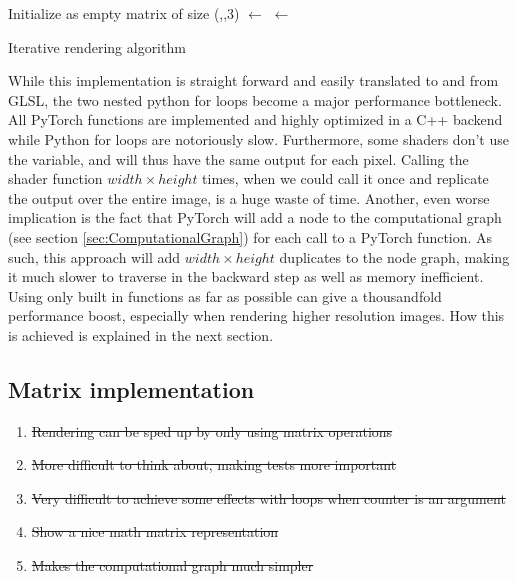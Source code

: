 \begin{algorithm}[H]


\BlankLine
Initialize \Img as empty matrix of size (\Width,\Height,3)\;
\Xs $\leftarrow$ \GetXs{\Width}\;
\Ys $\leftarrow$ \GetYs{\Height}\;
\Return \Img\;
\caption{Iterative rendering algorithm}
\label{alg:IterativeRendering}
\end{algorithm}

While this implementation is straight forward and easily translated to and from GLSL, the two nested python for loops become a major performance bottleneck. All PyTorch functions are implemented and highly optimized in a C++ backend while Python for loops are notoriously slow. Furthermore, some shaders don't use the  variable, and will thus have the same output for each pixel. Calling the shader function $width \times height$ times, when we could call it once and replicate the output over the entire image, is a huge waste of time. Another, even worse implication is the fact that PyTorch will add a node to the computational graph (see section \ref{sec:ComputationalGraph}) for each call to a PyTorch function. As such, this approach will add $width \times height$ duplicates to the node graph, making it much slower to traverse in the backward step as well as memory inefficient. Using only built in functions as far as possible can give a thousandfold performance boost, especially when rendering higher resolution images. How this is achieved is explained in the next section.

\subsection{Matrix implementation}\label{sec:MatrixImplementation}

\begin{enumerate}
    \item \st{Rendering can be sped up by only using matrix operations}
    \item \st{More difficult to think about, making tests more important}
    \item \st{Very difficult to achieve some effects with loops when counter is an argument}
    \item \st{Show a nice math matrix representation}
    \item \st{Makes the computational graph much simpler}
\end{enumerate}

